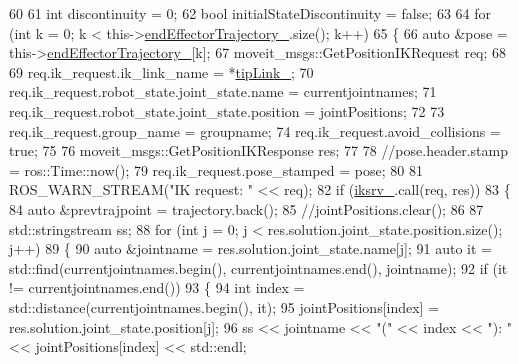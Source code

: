 \begin{DoxyCode}
60 
61         \textcolor{keywordtype}{int} discontinuity = 0;
62         \textcolor{keywordtype}{bool} initialStateDiscontinuity = \textcolor{keyword}{false};
63 
64         \textcolor{keywordflow}{for} (\textcolor{keywordtype}{int} k = 0; k < this->\hyperlink{classcl__move__group__interface_1_1CbMoveEndEffectorTrajectory_ae13dfd31ea3660646e03882f0c2c29f0}{endEffectorTrajectory\_}.size(); k++)
65         \{
66             \textcolor{keyword}{auto} &pose = this->\hyperlink{classcl__move__group__interface_1_1CbMoveEndEffectorTrajectory_ae13dfd31ea3660646e03882f0c2c29f0}{endEffectorTrajectory\_}[k];
67             moveit\_msgs::GetPositionIKRequest req;
68 
69             req.ik\_request.ik\_link\_name = *\hyperlink{classcl__move__group__interface_1_1CbMoveEndEffectorTrajectory_a24c6c30b9b0761a61fa002d947bd3e11}{tipLink\_};
70             req.ik\_request.robot\_state.joint\_state.name = currentjointnames;
71             req.ik\_request.robot\_state.joint\_state.position = jointPositions;
72 
73             req.ik\_request.group\_name = groupname;
74             req.ik\_request.avoid\_collisions = \textcolor{keyword}{true};
75 
76             moveit\_msgs::GetPositionIKResponse res;
77 
78             \textcolor{comment}{//pose.header.stamp = ros::Time::now();}
79             req.ik\_request.pose\_stamped = pose;
80 
81             ROS\_WARN\_STREAM(\textcolor{stringliteral}{"IK request: "} << req);
82             \textcolor{keywordflow}{if} (\hyperlink{classcl__move__group__interface_1_1CbMoveEndEffectorTrajectory_a8a2e2225a5b53325241e45e4e28fa3a7}{iksrv\_}.call(req, res))
83             \{
84                 \textcolor{keyword}{auto} &prevtrajpoint = trajectory.back();
85                 \textcolor{comment}{//jointPositions.clear();}
86 
87                 std::stringstream ss;
88                 \textcolor{keywordflow}{for} (\textcolor{keywordtype}{int} j = 0; j < res.solution.joint\_state.position.size(); j++)
89                 \{
90                     \textcolor{keyword}{auto} &jointname = res.solution.joint\_state.name[j];
91                     \textcolor{keyword}{auto} it = std::find(currentjointnames.begin(), currentjointnames.end(), jointname);
92                     \textcolor{keywordflow}{if} (it != currentjointnames.end())
93                     \{
94                         \textcolor{keywordtype}{int} index = std::distance(currentjointnames.begin(), it);
95                         jointPositions[index] = res.solution.joint\_state.position[j];
96                         ss << jointname << \textcolor{stringliteral}{"("} << index << \textcolor{stringliteral}{"): "} << jointPositions[index] << std::endl;

\end{DoxyCode}
